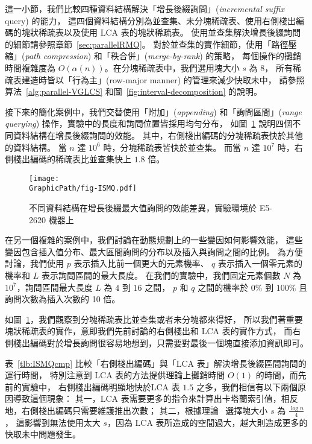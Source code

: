 這一小節，我們比較四種資料結構解決「增長後綴詢問」({\em incremental suffix} query) 的能力，
這四個資料結構分別為並查集、未分塊稀疏表、使用右側棧出編碼的塊狀稀疏表以及使用 LCA 表的塊狀稀疏表。
使用並查集解決增長後綴詢問的細節請參照章節~\ref{sec:parallelRMQ}。
對於並查集的實作細節，使用「路徑壓縮」({\em path compression}) 和「秩合併」({\em merge-by-rank}) 的策略，
每個操作的攤銷時間複雜度為 $O(\alpha(n))$。在分塊稀疏表中，我們選用塊大小 $s$ 為 $8$，
所有稀疏表建造時皆以「行為主」(row-major manner) 的管理來減少快取未中，
請參照算法~\ref{alg:parallel-VGLCS} 和圖~\ref{fig:interval-decomposition} 的說明。


接下來的簡化案例中，我們交替使用「附加」({\em appending}) 
和「詢問區間」({\em range querying}) 操作，實驗中的長度和詢問位置皆採用均勻分布，
如圖~\ref{fig:fig-ISMQcmp} 說明四個不同資料結構在增長後綴詢問的效能。
其中，右側棧出編碼的分塊稀疏表快於其他的資料結構。
當 $n$ 達 $10^6$ 時，分塊稀疏表皆快於並查集。
而當 $n$ 達 $10^7$ 時，右側棧出編碼的稀疏表比並查集快上 $1.8$ 倍。

\begin{figure}[!thb]
  \centering
  \texttt{[image: \\GraphicPath/fig-ISMQ.pdf]}
  \caption{
    不同資料結構在增長後綴最大值詢問的效能差異，實驗環境於 E5-2620 機器上}
  \label{fig:fig-ISMQcmp}
\end{figure}

在另一個複雜的案例中，我們討論在動態規劃上的一些變因如何影響效能，
這些變因包含插入值分布、最大區間詢問的分布以及插入與詢問之間的比例。
為方便討論，我們使用 $p$ 表示插入比前一個更大的元素機率、
$q$ 表示插入一個零元素的機率和 $L$ 表示詢問區間的最大長度。
在我們的實驗中，我們固定元素個數 $N$ 為 $10^7$，詢問區間最大長度 $L$ 為 $4$ 到 $16$ 之間，
$p$ 和 $q$ 之間的機率於 $0 \%$ 到 $100 \%$ 且詢問次數為插入次數的 10 倍。

如圖~\ref{fig:fig-ISMQcmp}，我們觀察到分塊稀疏表比並查集或者未分塊都來得好，
所以我們著重要塊狀稀疏表的實作，意即我們先前討論的右側棧出和 LCA 表的實作方式，
而右側棧出編碼對於增長詢問很容易地想到，只需要對最後一個塊直接添加資訊即可。

表~\ref{tlb:ISMQcmp} 比較「右側棧出編碼」與「LCA 表」解決增長後綴區間詢問的運行時間，
特別注意到 LCA 表的方法提供理論上攤銷時間 $O(1)$ 的時間，而先前的實驗中，
右側棧出編碼明顯地快於LCA 表 $1.5$ 之多，我們相信有以下兩個原因導致這個現象：
其一，LCA 表需要更多的指令來計算出卡塔蘭索引值，相反地，右側棧出編碼只需要維護推出次數；
其二，根據理論~\cite{Fischer2006TheoreticalAP} 選擇塊大小 $s$ 為 $\frac{\log n}{4}$，
這影響到無法使用太大 $s$，因為 LCA 表所造成的空間過大，越大則造成更多的快取未中問題發生。

